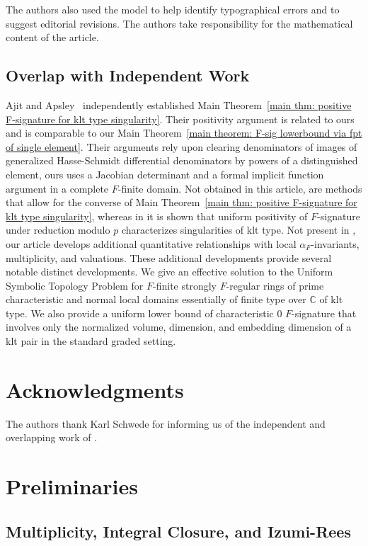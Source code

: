 \documentclass[12pt]{amsart}
\numberwithin{equation}{theorem}
\theoremstyle{plain}
\newcommand{\CC}{\mathbb{C}}
\begin{document}
The authors also used the model to help identify typographical errors and to suggest editorial revisions. The authors take responsibility for the mathematical content of the article.


\subsection{Overlap with Independent Work}
Ajit and Apsley~\cite{AjitApsley} independently established Main Theorem~\ref{main thm: positive F-signature for klt type singularity}. Their positivity argument is related to ours and \cite[Theorem~2.11]{AjitApsley} is comparable to our Main Theorem~\ref{main theorem: F-sig lowerbound via fpt of single element}. Their arguments rely upon clearing denominators of images of generalized Hasse-Schmidt differential denominators by powers of a distinguished element, ours uses a Jacobian determinant and a formal implicit function argument in a complete $F$-finite domain. Not obtained in this article, are methods that allow for the converse of Main Theorem~\ref{main thm: positive F-signature for klt type singularity}, whereas in \cite{AjitApsley} it is shown that uniform positivity of $F$-signature under reduction modulo $p$ characterizes singularities of klt type. Not present in \cite{AjitApsley}, our article develops additional quantitative relationships with local $\alpha_F$-invariants, multiplicity, and valuations. These additional developments provide several notable distinct developments. We give an effective solution to the Uniform Symbolic Topology Problem for $F$-finite strongly $F$-regular rings of prime characteristic and normal local domains essentially of finite type over $\CC$ of klt type. We also provide a uniform lower bound of characteristic $0$ $F$-signature that involves only the normalized volume, dimension, and embedding dimension of a klt pair in the standard graded setting.


\section*{Acknowledgments}
The authors thank Karl Schwede for informing us of the independent and overlapping work of \cite{AjitApsley}.

\section{Preliminaries}


\subsection{Multiplicity, Integral Closure, and Izumi-Rees}
\end{document}
